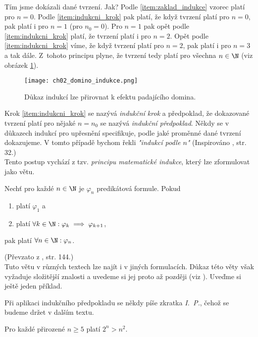 Tím jsme dokázali dané tvrzení. Jak? Podle \ref{item:zaklad_indukce} vzorec platí pro $n=0$. Podle \ref{item:indukcni_krok} pak platí, že když tvrzení platí pro $n=0$, pak platí i pro $n=1$ (pro $n_0=0$). Pro $n=1$ pak opět podle \ref{item:indukcni_krok} platí, že tvrzení platí i pro $n=2$. Opět podle \ref{item:indukcni_krok} víme, že když tvrzení platí pro $n=2$, pak platí i pro $n=3$ a tak dále. Z~tohoto principu plyne, že tvrzení tedy platí pro všechna $n\in\N$ (viz obrázek \ref{fig:domino}).
\begin{figure}[h]
    \centering
    \texttt{[image: ch02\_domino\_indukce.png]}
    \caption{Důkaz indukcí lze přirovnat k efektu padajícího domina.}
    \label{fig:domino}
\end{figure}
Krok \ref{item:indukcni_krok} se nazývá \emph{indukční krok} a předpoklad, že dokazované tvrzení platí pro nějaké $n=n_0$ se nazývá \emph{indukční předpoklad}. Někdy se v důkazech indukcí pro upřesnění specifikuje, podle jaké proměnné dané tvrzení dokazujeme. V tomto případě bychom řekli \emph{"indukcí podle $n$"} (Inspirováno \cite{MatousekNesetril2009}, str. 32.)\\
Tento postup vychází z tzv. \emph{principu matematické indukce}, který lze zformulovat jako větu.
\begin{theorem}
    Nechť pro každé $n\in\N$ je $\varphi_n$ predikátová formule. Pokud
    \begin{enumerate}[label=(\roman*)]
        \item platí $\varphi_1$ a
        \item platí $\forall k\in\N: \varphi_k \implies \varphi_{k+1}$,
    \end{enumerate}
    pak platí $\forall n\in\N: \varphi_n$.
\end{theorem}
(Převzato z \cite{ChartrandPolimeniZhang2014}, str. 144.)\\
Tuto větu v různých textech lze najít i v jiných formulacích. Důkaz této věty však vyžaduje složitější znalosti a uvedeme si jej proto až později (viz ). Uveďme si ještě jeden příklad.
\begin{convention}
    Při aplikaci indukčního předpokladu se někdy píše zkratka \emph{I.~P.}, čehož se budeme držet v dalším textu.
\end{convention}
\begin{assertion}
    Pro každé přirozené $n\geq 5$ platí $2^n>n^2$.
\end{assertion}
